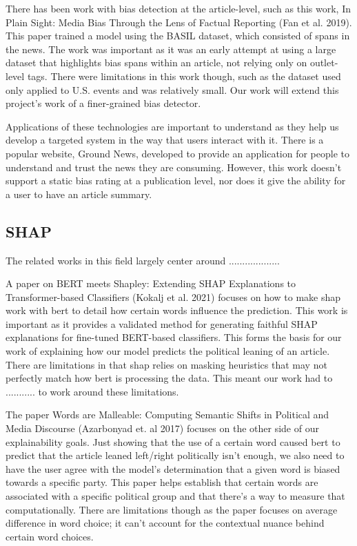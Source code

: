 \documentclass{article}
\begin{document}
There has been work with bias detection at the article-level, such as this work, In Plain Sight: Media Bias Through the Lens of Factual Reporting (Fan et al. 2019). This paper trained a model using the BASIL dataset, which consisted of spans in the news. The work was important as it was an early attempt at using a large dataset that highlights bias spans within an article, not relying only on outlet-level tags. There were limitations in this work though, such as the dataset used only applied to U.S. events and was relatively small. Our work will extend this project's work of a finer-grained bias detector.

Applications of these technologies are important to understand as they help us develop a targeted system in the way that users interact with it. There is a popular website, Ground News, developed to provide an application for people to understand and trust the news they are consuming. However, this work doesn't support a static bias rating at a publication level, nor does it give the ability for a user to have an article summary.

\subsection{SHAP}

The related works in this field largely center around ...................

A paper on BERT meets Shapley: Extending SHAP Explanations to Transformer-based Classifiers (Kokalj et al. 2021) focuses on how to make shap work with bert to detail how certain words influence the prediction. This work is important as it provides a validated method for generating faithful SHAP explanations for fine-tuned BERT-based classifiers. This forms the basis for our work of explaining how our model predicts the political leaning of an article. There are limitations in that shap relies on masking heuristics that may not perfectly match how bert is processing the data. This meant our work had to ........... to work around these limitations.

The paper Words are Malleable: Computing Semantic Shifts in Political and Media Discourse (Azarbonyad et. al 2017) focuses on the other side of our explainability goals. Just showing that the use of a certain word caused bert to predict that the article leaned left/right politically isn’t enough, we also need to have the user agree with the model’s determination that a given word is biased towards a specific party. This paper helps establish that certain words are associated with a specific political group and that there’s a way to measure that computationally. There are limitations though as the paper focuses on average difference in word choice; it can’t account for the contextual nuance behind certain word choices.
\end{document}
